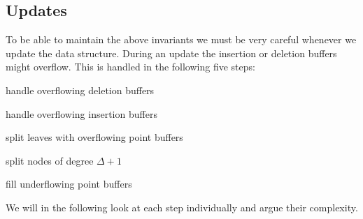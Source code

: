 \documentclass[twoside,11pt,openright]{report}
\begin{document}
\subsection{Updates}
To be able to maintain the above invariants we must be very careful whenever we update the data structure. During an update the insertion or deletion buffers might overflow. This is handled in the following five steps:
\begin{inlinelist}
	\item handle overflowing deletion buffers
	\item handle overflowing insertion buffers
	\item split leaves with overflowing point buffers
	\item split nodes of degree $\Delta+1$
	\item fill underflowing point buffers
\end{inlinelist}

We will in the following look at each step individually and argue their complexity.
\end{document}

